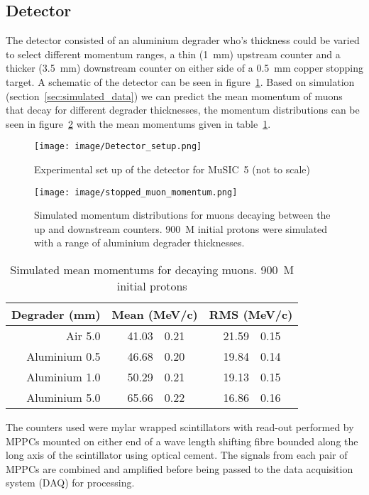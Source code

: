 \documentclass[]{article}
\begin{document}
\subsection{Detector} %
\label{sub:detector}
The detector consisted of an aluminium degrader who's thickness could be varied to select different momentum ranges, a thin (1~mm) upstream counter and a thicker (3.5~mm) downstream counter on either side of a 0.5~mm copper stopping target. A schematic of the detector can be seen in figure~\ref{fig:setup}. Based on simulation (section~\ref{sec:simulated_data}) we can predict the mean momentum of muons that decay for different degrader thicknesses, the momentum distributions can be seen in figure~\ref{fig:stopped_muon_mom} with the mean momentums given in table~\ref{tab:stopped_muon_mom}.
\begin{figure}[htbp]
	\centering
		\texttt{[image: image/Detector\_setup.png]}
	\caption{Experimental set up of the detector for MuSIC~5 (not to scale)}
	\label{fig:setup}
\end{figure}  
\begin{figure}[htbp]
	\centering
		\texttt{[image: image/stopped\_muon\_momentum.png]}
	\caption{Simulated momentum distributions for muons decaying between the up and downstream counters. 900~M initial protons were simulated with a range of aluminium degrader thicknesses.}
	\label{fig:stopped_muon_mom}
\end{figure}
\begin{table}
	\begin{center}
	\begin{tabular}{r|r@{ $\pm$ }l|r@{ $\pm$ }l} %
		Degrader (mm) & \multicolumn{2}{|c|}{Mean (MeV/c)} & \multicolumn{2}{|c}{RMS (MeV/c)}\\
		\hline
		Air 5.0       & 41.03 & 0.21 & 21.59 & 0.15 \\
		Aluminium 0.5 & 46.68 & 0.20 & 19.84 & 0.14 \\
		Aluminium 1.0 & 50.29 & 0.21 & 19.13 & 0.15 \\
		Aluminium 5.0 & 65.66 & 0.22 & 16.86 & 0.16 \\
	\end{tabular}
	\end{center}
	\caption{Simulated mean momentums for decaying muons. 900~M initial protons}
	\label{tab:stopped_muon_mom}
\end{table}

The counters used were mylar wrapped scintillators with read-out performed by MPPCs mounted on either end of a wave length shifting fibre bounded along the long axis of the scintillator using optical cement. The signals from each pair of MPPCs are combined and amplified before being passed to the data acquisition system (DAQ) for processing.
\end{document}

